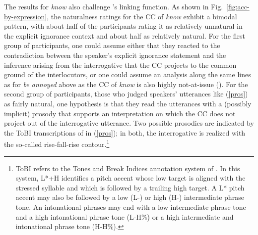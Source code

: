 \documentclass[11pt,fleqn]{article}
\newcommand{\6}{\mbox{$[\hspace*{-.6mm}[$}}
\newcommand{\9}{\mbox{$]\hspace*{-.6mm}]$}}
\newcommand{\citepos}[1]{\citeauthor{#1}'s \citeyear{#1}}
\begin{document}
The results for {\em know} also challenge \citepos{mandelkern-etal2020} linking function. As shown in Fig.~\ref{fig:acc-by-expression}, the naturalness ratings for the CC of {\em know} exhibit a bimodal pattern, with about half of the participants rating it as relatively unnatural in the explicit ignorance context and about half as relatively natural. For the first group of participants, one could assume either that they reacted to the contradiction between the speaker's explicit ignorance statement and the inference arising from the interrogative that the CC projects to the common ground of the interlocutors, or one could assume an analysis along the same lines as for {\em be annoyed} above as the CC of {\em know} is also highly not-at-issue (\citealt{tbd-variability}). For the second group of participants, those who judged speakers' utterances like (\ref{pros}) as fairly natural, one hypothesis is that they read the utterances with a (possibly implicit) prosody that supports an interpretation on which the CC does not project out of the interrogative utterance. Two possible prosodies are indicated by the ToBI transcriptions of in (\ref{pros}); in both, the interrogative is realized with the so-called rise-fall-rise contour.\footnote{ToBI refers to the Tones and Break Indices annotation system of \citealt{beckman-ayers97}. In this system, L*+H identifies a pitch accent whose low target is aligned with the stressed syllable and which is followed by a trailing high target. A L* pitch accent may also be followed by a low (L-) or high (H-) intermediate phrase tone. An intonational phrases may end with a low intermediate phrase tone and a high intonational phrase tone (L-H\%) or a high intermediate and intonational phrase tone (H-H\%).}
\end{document}
